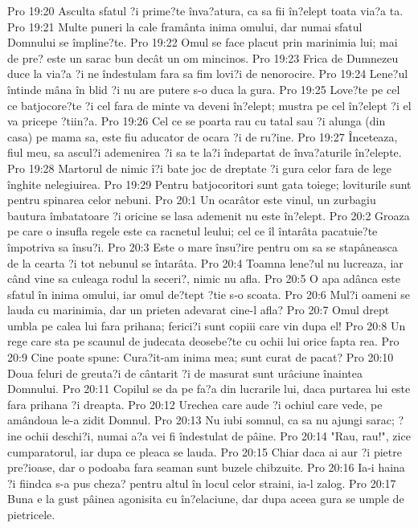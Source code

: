 Pro 19:20  Asculta sfatul ?i prime?te înva?atura, ca sa fii în?elept toata via?a ta.
Pro 19:21  Multe puneri la cale framânta inima omului, dar numai sfatul Domnului se împline?te.
Pro 19:22  Omul se face placut prin marinimia lui; mai de pre? este un sarac bun decât un om mincinos.
Pro 19:23  Frica de Dumnezeu duce la via?a ?i ne îndestulam fara sa fim lovi?i de nenorocire.
Pro 19:24  Lene?ul întinde mâna în blid ?i nu are putere s-o duca la gura.
Pro 19:25  Love?te pe cel ce batjocore?te ?i cel fara de minte va deveni în?elept; mustra pe cel în?elept ?i el va pricepe ?tiin?a.
Pro 19:26  Cel ce se poarta rau cu tatal sau ?i alunga (din casa) pe mama sa, este fiu aducator de ocara ?i de ru?ine.
Pro 19:27  Înceteaza, fiul meu, sa ascul?i ademenirea ?i sa te la?i îndepartat de înva?aturile în?elepte.
Pro 19:28  Martorul de nimic î?i bate joc de dreptate ?i gura celor fara de lege înghite nelegiuirea.
Pro 19:29  Pentru batjocoritori sunt gata toiege; loviturile sunt pentru spinarea celor nebuni.
Pro 20:1  Un ocarâtor este vinul, un zurbagiu bautura îmbatatoare ?i oricine se lasa ademenit nu este în?elept.
Pro 20:2  Groaza pe care o insufla regele este ca racnetul leului; cel ce îl întarâta pacatuie?te împotriva sa însu?i.
Pro 20:3  Este o mare însu?ire pentru om sa se stapâneasca de la cearta ?i tot nebunul se întarâta.
Pro 20:4  Toamna lene?ul nu lucreaza, iar când vine sa culeaga rodul la seceri?, nimic nu afla.
Pro 20:5  O apa adânca este sfatul în inima omului, iar omul de?tept ?tie s-o scoata.
Pro 20:6  Mul?i oameni se lauda cu marinimia, dar un prieten adevarat cine-l afla?
Pro 20:7  Omul drept umbla pe calea lui fara prihana; ferici?i sunt copiii care vin dupa el!
Pro 20:8  Un rege care sta pe scaunul de judecata deosebe?te cu ochii lui orice fapta rea.
Pro 20:9  Cine poate spune: Cura?it-am inima mea; sunt curat de pacat?
Pro 20:10  Doua feluri de greuta?i de cântarit ?i de masurat sunt urâciune înaintea Domnului.
Pro 20:11  Copilul se da pe fa?a din lucrarile lui, daca purtarea lui este fara prihana ?i dreapta.
Pro 20:12  Urechea care aude ?i ochiul care vede, pe amândoua le-a zidit Domnul.
Pro 20:13  Nu iubi somnul, ca sa nu ajungi sarac; ?ine ochii deschi?i, numai a?a vei fi îndestulat de pâine.
Pro 20:14  "Rau, rau!", zice cumparatorul, iar dupa ce pleaca se lauda.
Pro 20:15  Chiar daca ai aur ?i pietre pre?ioase, dar o podoaba fara seaman sunt buzele chibzuite.
Pro 20:16  Ia-i haina ?i fiindca s-a pus cheza? pentru altul în locul celor straini, ia-l zalog.
Pro 20:17  Buna e la gust pâinea agonisita cu în?elaciune, dar dupa aceea gura se umple de pietricele.
